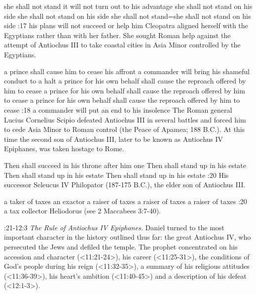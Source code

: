     {she shall not stand} %
    {it will not turn out to his advantage} %
    {she shall not stand on his side} %
    {she shall not stand on his side} %
    {she shall not stand}={she shall not stand on his side} %
:17 {his plans will not succeed or help him} 
Cleopatra aligned herself with the Egyptians rather than with her father. 
She sought Roman help against the attempt of Antiochus III to take coastal cities in Asia Minor controlled by the Egyptians.

    {a prince shall cause him to cease his affront} %
    {a commander will bring his shameful conduct to a halt} %
    {a prince for his own behalf shall cause the reproach offered by him to cease} %
    {a prince for his own behalf shall cause the reproach offered by him to cease} %
    {a prince for his own behalf shall cause the reproach offered by him to cease} %
:18 {a commander will put an end to his insolence} The Roman general Lucius Cornelius Scipio
defeated Antiochus III in several battles and forced him to cede Asia Minor to Roman control (the Peace of Apamea; 188 B.C.).
At this time the second son of Antiochus III, later to be known as Antiochus IV Epiphanes, was taken  hostage to Rome.

    {Then shall succeed in his throne} %
    {after him one} %
    {Then shall stand up in his estate} %
    {Then shall stand up in his estate} %
    {Then shall stand up in his estate} %
:20 {His successor} Seleucus IV Philopator (187-175 B.C.), the elder son of Antiochus III. 

    {a taker of taxes} %
    {an exactor} %
    {a raiser of taxes} %
    {a raiser of taxes} %
    {a raiser of taxes} %
:20 {a tax collector} Heliodorus (see 2 Maccabees 3:7-40). 

:21-12:3 {} {\it The Rule of Antiochus IV Epiphanes.}\/ Daniel turned 
to the most important character in the history outlined thus far: the great Antiochus IV, who persecuted the Jews and defiled the temple.
The prophet concentrated on his accession and character (<11:21-24>), his career (<11:25-31>), the conditions of God's people 
during his reign (<11:32-35>), a summary of his religious attitudes (<11:36-39>), his heart's ambition (<11:40-45>) and a description of his defeat (<12:1-3>).

